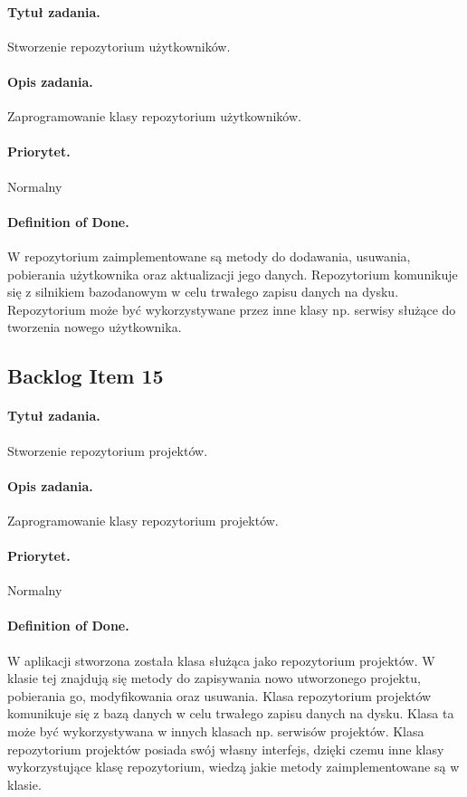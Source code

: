 \documentclass[a4paper]{article}
\begin{document}
\paragraph{Tytuł zadania.} Stworzenie repozytorium użytkowników.
\paragraph{Opis zadania.} Zaprogramowanie klasy repozytorium użytkowników.
\paragraph{Priorytet.} Normalny
\paragraph{Definition of Done.} W repozytorium zaimplementowane są metody do dodawania, usuwania, pobierania użytkownika oraz aktualizacji jego danych. Repozytorium komunikuje się z silnikiem bazodanowym w celu trwałego zapisu danych na dysku. Repozytorium może być wykorzystywane przez inne klasy np. serwisy służące do tworzenia nowego użytkownika.

\subsection{Backlog Item 15} 
\paragraph{Tytuł zadania.} Stworzenie repozytorium projektów.
\paragraph{Opis zadania.} Zaprogramowanie klasy repozytorium projektów.
\paragraph{Priorytet.} Normalny
\paragraph{Definition of Done.} W aplikacji stworzona została klasa służąca jako repozytorium projektów. W klasie tej znajdują się metody do zapisywania nowo utworzonego projektu, pobierania go, modyfikowania oraz usuwania. Klasa repozytorium projektów komunikuje się z bazą danych w celu trwałego zapisu danych na dysku. Klasa ta może być wykorzystywana w innych klasach np. serwisów projektów. Klasa repozytorium projektów posiada swój własny interfejs, dzięki czemu inne klasy wykorzystujące klasę repozytorium, wiedzą jakie metody zaimplementowane są w klasie.
\end{document}
